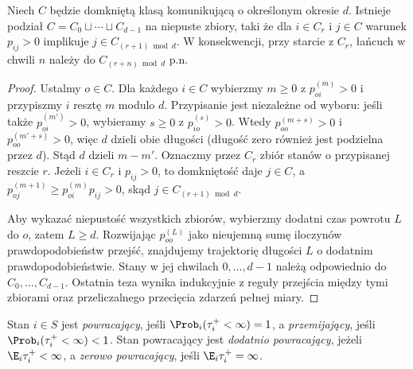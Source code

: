 \begin{stwierdzenie}
\label{prop:rp1-12-cyclic-classes}
Niech $C$ będzie domkniętą klasą komunikującą
o określonym okresie $d$. Istnieje podział
$C=C_0\sqcup\cdots\sqcup C_{d-1}$ na niepuste zbiory,
taki że dla $i\in C_r$ i $j\in C$ warunek $p_{ij}>0$
implikuje $j\in C_{(r+1)\bmod d}$.
W konsekwencji, przy starcie z $C_r$, łańcuch
w chwili $n$ należy do $C_{(r+n)\bmod d}$ p.n.
\end{stwierdzenie}
\begin{proof}
Ustalmy $o\in C$. Dla każdego $i\in C$ wybierzmy
$m\geq0$ z $p_{oi}^{(m)}>0$ i przypiszmy $i$ resztę
$m$ modulo $d$. Przypisanie jest niezależne od wyboru:
jeśli także $p_{oi}^{(m')}>0$, wybieramy
$s\geq0$ z $p_{io}^{(s)}>0$.
Wtedy $p_{oo}^{(m+s)}>0$ i $p_{oo}^{(m'+s)}>0$,
więc $d$ dzieli obie długości (długość zero
również jest podzielna przez $d$). Stąd $d$ dzieli
$m-m'$. Oznaczmy przez $C_r$ zbiór stanów
o przypisanej reszcie $r$.
Jeżeli $i\in C_r$ i $p_{ij}>0$, to domkniętość
daje $j\in C$, a $p_{oj}^{(m+1)}\geq
p_{oi}^{(m)}p_{ij}>0$, skąd $j\in C_{(r+1)\bmod d}$.

Aby wykazać niepustość wszystkich zbiorów, wybierzmy
dodatni czas powrotu $L$ do $o$, zatem $L\geq d$.
Rozwijając $p_{oo}^{(L)}$ jako nieujemną sumę
iloczynów prawdopodobieństw przejść, znajdujemy
trajektorię długości $L$ o dodatnim prawdopodobieństwie.
Stany w jej chwilach $0,\ldots,d-1$ należą odpowiednio
do $C_0,\ldots,C_{d-1}$. Ostatnia teza wynika
indukcyjnie z reguły przejścia między tymi zbiorami
oraz przeliczalnego przecięcia zdarzeń pełnej miary.
\end{proof}

\begin{definicja}
Stan $i\in S$ jest \emph{powracający}, jeśli
$\Prob_i(\tau_i^+<\infty)=1$, a
\emph{przemijający}, jeśli
$\Prob_i(\tau_i^+<\infty)<1$.
Stan powracający jest \emph{dodatnio powracający},
jeżeli $\E_i\tau_i^+<\infty$, a \emph{zerowo
powracający}, jeśli $\E_i\tau_i^+=\infty$.
\end{definicja}

